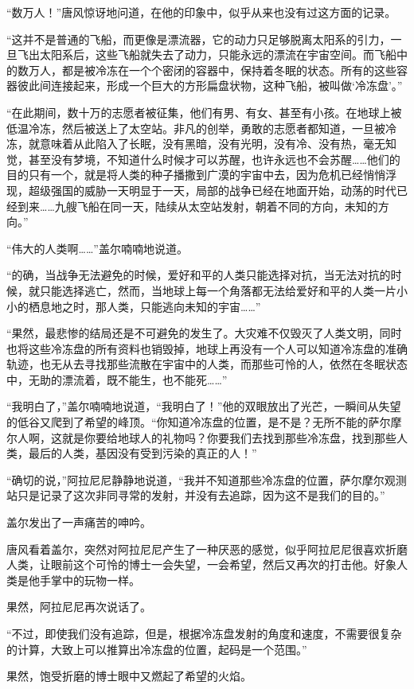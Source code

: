 “数万人！”唐风惊讶地问道，在他的印象中，似乎从来也没有过这方面的记录。

“这并不是普通的飞船，而更像是漂流器，它的动力只足够脱离太阳系的引力，一旦飞出太阳系后，这些飞船就失去了动力，只能永远的漂流在宇宙空间。而飞船中的数万人，都是被冷冻在一个个密闭的容器中，保持着冬眠的状态。所有的这些容器彼此间连接起来，形成一个巨大的方形扁盘状物，这种飞船，被叫做‘冷冻盘’。”

“在此期间，数十万的志愿者被征集，他们有男、有女、甚至有小孩。在地球上被低温冷冻，然后被送上了太空站。非凡的创举，勇敢的志愿者都知道，一旦被冷冻，就意味着从此陷入了长眠，没有黑暗，没有光明，没有冷、没有热，毫无知觉，甚至没有梦境，不知道什么时候才可以苏醒，也许永远也不会苏醒……他们的目的只有一个，就是将人类的种子播撒到广漠的宇宙中去，因为危机已经悄悄浮现，超级强国的威胁一天明显于一天，局部的战争已经在地面开始，动荡的时代已经到来……九艘飞船在同一天，陆续从太空站发射，朝着不同的方向，未知的方向。”

“伟大的人类啊……”盖尔喃喃地说道。

“的确，当战争无法避免的时候，爱好和平的人类只能选择对抗，当无法对抗的时候，就只能选择逃亡，然而，当地球上每一个角落都无法给爱好和平的人类一片小小的栖息地之时，那人类，只能逃向未知的宇宙……”

“果然，最悲惨的结局还是不可避免的发生了。大灾难不仅毁灭了人类文明，同时也将这些冷冻盘的所有资料也销毁掉，地球上再没有一个人可以知道冷冻盘的准确轨迹，也无从去寻找那些流散在宇宙中的人类，而那些可怜的人，依然在冬眠状态中，无助的漂流着，既不能生，也不能死……”

“我明白了，”盖尔喃喃地说道，“我明白了！”他的双眼放出了光芒，一瞬间从失望的低谷又爬到了希望的峰顶。“你知道冷冻盘的位置，是不是？无所不能的萨尔摩尔人啊，这就是你要给地球人的礼物吗？你要我们去找到那些冷冻盘，找到那些人类，最后的人类，基因没有受到污染的真正的人！”

“确切的说，”阿拉尼尼静静地说道，“我并不知道那些冷冻盘的位置，萨尔摩尔观测站只是记录了这次非同寻常的发射，并没有去追踪，因为这不是我们的目的。”

盖尔发出了一声痛苦的呻吟。

唐风看着盖尔，突然对阿拉尼尼产生了一种厌恶的感觉，似乎阿拉尼尼很喜欢折磨人类，让眼前这个可怜的博士一会失望，一会希望，然后又再次的打击他。好象人类是他手掌中的玩物一样。

果然，阿拉尼尼再次说话了。

“不过，即使我们没有追踪，但是，根据冷冻盘发射的角度和速度，不需要很复杂的计算，大致上可以推算出冷冻盘的位置，起码是一个范围。”

果然，饱受折磨的博士眼中又燃起了希望的火焰。

